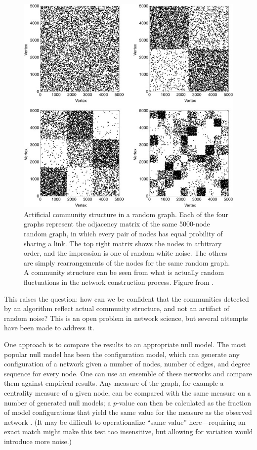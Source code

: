 \begin{figure}
\centering
\includegraphics{img/fortunato2016_fig29_randomcommunities.jpg}
\caption{Artificial community structure in a random graph. Each of the
four graphs represent the adjacency matrix of the same 5000-node random
graph, in which every pair of nodes has equal probility of sharing a
link. The top right matrix shows the nodes in arbitrary order, and the
impression is one of random white noise. The others are simply
rearrangements of the nodes for the same random graph. A community
structure can be seen from what is actually random fluctuations in the
network construction process. Figure from
\autocite{fortunato_community_2016}.}\label{fig:randomcommunities}
\end{figure}

This raises the question: how can we be confident that the communities
detected by an algorithm reflect actual community structure, and not an
artifact of random noise? This is an open problem in network science,
but several attempts have been made to address it.

One approach is to compare the results to an appropriate null model. The
most popular null model has been the configuration model, which can
generate any configuration of a network given a number of nodes, number
of edges, and degree sequence for every node. One can use an ensemble of
these networks and compare them against empirical results. Any measure
of the graph, for example a centrality measure of a given node, can be
compared with the same measure on a number of generated null models; a
\(p\)-value can then be calculated as the fraction of model
configurations that yield the same value for the measure as the observed
network \autocite{fortunato_community_2016}. (It may be difficult to
operationalize ``same value'' here---requiring an exact match might make
this test too insensitive, but allowing for variation would introduce
more noise.)

